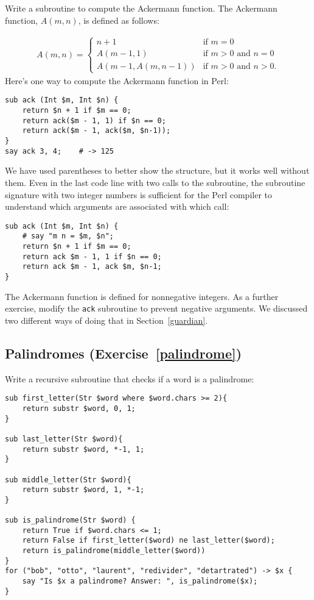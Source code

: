 Write a subroutine to compute the Ackermann function. The Ackermann function, $A(m, n)$, is defined as follows:

\begin{eqnarray*}
A(m, n) = \begin{cases} 
              n+1 & \mbox{if } m = 0 \\ 
        A(m-1, 1) & \mbox{if } m > 0 \mbox{ and } n = 0 \\ 
A(m-1, A(m, n-1)) & \mbox{if } m > 0 \mbox{ and } n > 0.
\end{cases} 
\end{eqnarray*}
%
Here's one way to compute the Ackermann function in Perl:

\begin{verbatim}
sub ack (Int $m, Int $n) {
    return $n + 1 if $m == 0;
    return ack($m - 1, 1) if $n == 0;
    return ack($m - 1, ack($m, $n-1));
}
say ack 3, 4;    # -> 125
\end{verbatim}

We have used parentheses to better show the structure, but 
it works well without them. Even in the last code line with
two calls to the subroutine, the subroutine signature with 
two integer numbers is sufficient for the Perl compiler 
to understand which arguments are associated with which call:

\begin{verbatim}
sub ack (Int $m, Int $n) {
    # say "m n = $m, $n";
    return $n + 1 if $m == 0;
    return ack $m - 1, 1 if $n == 0;
    return ack $m - 1, ack $m, $n-1;
}
\end{verbatim}
%

The Ackermann function is defined for nonnegative integers. 
As a further exercise, modify the {\tt ack} subroutine to 
prevent negative arguments. We discussed two different ways 
of doing that in Section~\ref{guardian}.


\subsection{Palindromes (Exercise~\ref{palindrome})}
\label{sol_palindrome}

Write a recursive subroutine that checks if a word is a 
palindrome:

\begin{verbatim}
sub first_letter(Str $word where $word.chars >= 2){
    return substr $word, 0, 1;
}

sub last_letter(Str $word){
    return substr $word, *-1, 1;
}

sub middle_letter(Str $word){
    return substr $word, 1, *-1;
}

sub is_palindrome(Str $word) {
    return True if $word.chars <= 1;
    return False if first_letter($word) ne last_letter($word);
    return is_palindrome(middle_letter($word))
}
for ("bob", "otto", "laurent", "redivider", "detartrated") -> $x {
    say "Is $x a palindrome? Answer: ", is_palindrome($x);
}
\end{verbatim}

